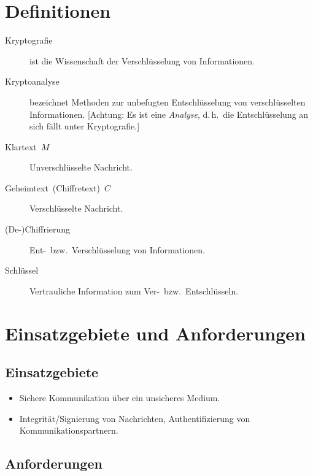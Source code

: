 \section{Definitionen}
\begin{description}
  \item [{Kryptografie}] 
	ist die Wissenschaft der Verschlüsselung von Informationen.
  \item [{Kryptoanalyse}] 
	bezeichnet Methoden zur unbefugten Entschlüsselung von verschlüsselten Informationen.
	[Achtung: Es ist eine \emph{Analyse}, d.\,h.~die Entschlüsselung an sich fällt unter Kryptografie.]
  \item [{Klartext~$M$}] 
	Unverschlüsselte Nachricht.
  \item [{Geheimtext~(Chiffretext)~$C$}] 
	Verschlüsselte Nachricht.
  \item [{(De-)Chiffrierung}] 
	Ent-~bzw.~Verschlüsselung von Informationen.
  \item [{Schlüssel}] 
	Vertrauliche Information zum Ver-~bzw.~Entschlüsseln.
\end{description}

\section{Einsatzgebiete und Anforderungen}


\subsection{Einsatzgebiete}
\begin{itemize}
  \item Sichere 
	Kommunikation über ein unsicheres Medium.
  \item Integrität/Signierung von Nachrichten, Authentifizierung von Kommunikationspartnern.
\end{itemize}

\subsection{Anforderungen}

